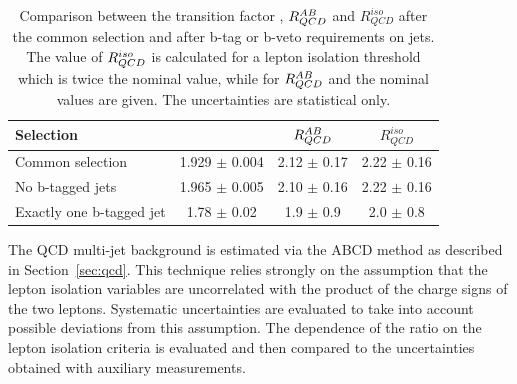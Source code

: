 \begin{table} [!tp]
	  \caption{Comparison between the transition factor \rqcd, $R_{QCD}^{AB}$ and $R_{QCD}^{iso}$ after the common selection 
	and after b-tag or b-veto requirements on jets. 
	The value of $R_{QCD}^{iso}$ is calculated for a  lepton isolation threshold which is twice the nominal value,
	while  for  $R_{QCD}^{AB}$ and \rqcd the nominal values are given. The uncertainties are statistical only.}
	\vspace{3mm}

	\begin{center}
	\begin{tabular}{l  c c c }
\hline 
\hline
Selection  		&  \rqcd  			&  $R_{QCD}^{AB}$  		&  $R_{QCD}^{iso}$ \\ 
\hline
Common selection 		&   1.929 $\pm$     0.004	&	2.12 $\pm$ 0.17		&	2.22 $\pm$ 0.16	\\
No b-tagged jets		&  1.965   $\pm$   0.005    	& 2.10   $\pm$	0.16 		&	2.22 $\pm$ 0.16	\\
Exactly one b-tagged jet	&  1.78    $\pm$   0.02 	& 1.9   $\pm$	0.9 		&	2.0  $\pm$ 0.8	\\
\hline
\hline
	\end{tabular}
	\label{table:MCsub}
	\end{center}
\end{table}

The QCD multi-jet background is estimated via the ABCD method as
described in Section~\ref{sec:qcd}. This technique relies strongly on
the assumption that the lepton isolation variables are uncorrelated with the product of the
charge signs of the two leptons. Systematic uncertainties
are evaluated to take into account possible deviations from this assumption.
The dependence of the ratio  \rqcd on the lepton isolation criteria is evaluated and then
compared to the uncertainties obtained with auxiliary measurements. 

